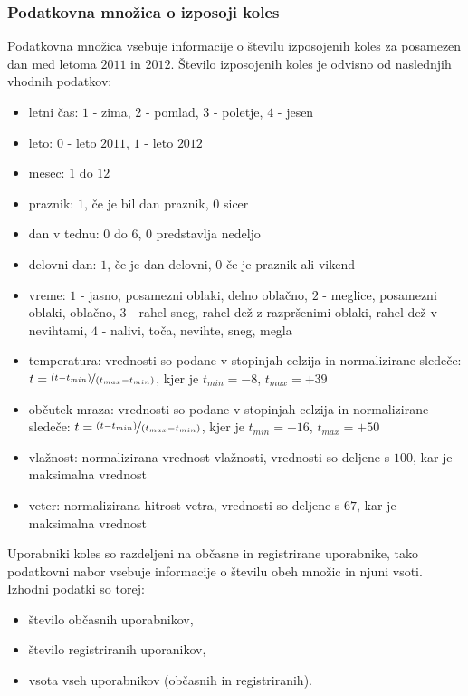 \documentclass[mat1]{fmfdelo}
\begin{document}
\subsubsection{Podatkovna množica o izposoji koles}
Podatkovna množica vsebuje informacije o številu izposojenih koles za posamezen dan med letoma $2011$ in $2012$. Število izposojenih koles je odvisno od naslednjih vhodnih podatkov: 
\begin{itemize}
	\item letni čas: $1$ - zima, $2$ - pomlad, $3$ - poletje, $4$ - jesen
	\item leto: $0$ - leto $2011$, $1$ - leto $2012$
	\item mesec: $1$ do $12$
	\item praznik: $1$, če je bil dan praznik, $0$ sicer
	\item dan v tednu: $0$ do $6$, $0$ predstavlja nedeljo
	\item delovni dan: $1$, če je dan delovni, $0$ če je praznik ali vikend
	\item vreme: $1$ - jasno, posamezni oblaki, delno oblačno, $2$ - meglice, posamezni oblaki, oblačno,  $3$ - rahel sneg, rahel dež z razpršenimi oblaki, rahel dež v nevihtami, $4$ - nalivi, toča, nevihte, sneg, megla
	\item temperatura: vrednosti so podane v stopinjah celzija in normalizirane sledeče: $t=\nicefrac{(t-t_{min})}{(t_{max}-t_{min})}$, kjer je $t_{min}=-8$, $t_{max}=+39$
	\item občutek mraza: vrednosti so podane v stopinjah celzija in normalizirane sledeče: $t=\nicefrac{(t-t_{min})}{(t_{max}-t_{min})}$, kjer je $t_{min}=-16$, $t_{max}=+50$
	\item vlažnost: normalizirana vrednost vlažnosti, vrednosti so deljene s $100$, kar je maksimalna vrednost
	\item veter: normalizirana hitrost vetra, vrednosti so deljene s $67$, kar je maksimalna vrednost
\end{itemize}

Uporabniki koles so razdeljeni na občasne in registrirane uporabnike, tako podatkovni nabor vsebuje informacije o številu obeh množic in njuni vsoti. Izhodni podatki so torej:
\begin{itemize}
	\item število občasnih uporabnikov,
	\item število registriranih uporanikov,
	\item vsota vseh uporabnikov (občasnih in registriranih).
\end{itemize}
\end{document}
